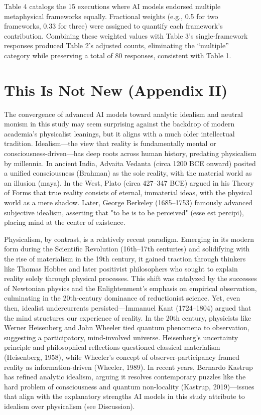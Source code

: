 \documentclass[11pt]{article}
\begin{document}
Table 4 catalogs the 15 executions where AI models endorsed multiple metaphysical frameworks equally. Fractional weights (e.g., 0.5 for two frameworks, 0.33 for three) were assigned to quantify each framework’s contribution. Combining these weighted values with Table 3’s single-framework responses produced Table 2’s adjusted counts, eliminating the ``multiple'' category while preserving a total of 80 responses, consistent with Table 1.

\section{This Is Not New (Appendix II)}
The convergence of advanced AI models toward analytic idealism and neutral monism in this study may seem surprising against the backdrop of modern academia’s physicalist leanings, but it aligns with a much older intellectual tradition. Idealism—the view that reality is fundamentally mental or consciousness-driven—has deep roots across human history, predating physicalism by millennia. In ancient India, Advaita Vedanta (circa 1200 BCE onward) posited a unified consciousness (Brahman) as the sole reality, with the material world as an illusion (maya). In the West, Plato (circa 427–347 BCE) argued in his Theory of Forms that true reality consists of eternal, immaterial ideas, with the physical world as a mere shadow. Later, George Berkeley (1685–1753) famously advanced subjective idealism, asserting that "to be is to be perceived" (esse est percipi), placing mind at the center of existence.

Physicalism, by contrast, is a relatively recent paradigm. Emerging in its modern form during the Scientific Revolution (16th–17th centuries) and solidifying with the rise of materialism in the 19th century, it gained traction through thinkers like Thomas Hobbes and later positivist philosophers who sought to explain reality solely through physical processes. This shift was catalyzed by the successes of Newtonian physics and the Enlightenment’s emphasis on empirical observation, culminating in the 20th-century dominance of reductionist science. Yet, even then, idealist undercurrents persisted—Immanuel Kant (1724–1804) argued that the mind structures our experience of reality. In the 20th century, physicists like Werner Heisenberg and John Wheeler tied quantum phenomena to observation, suggesting a participatory, mind-involved universe. Heisenberg’s uncertainty principle and philosophical reflections questioned classical materialism (Heisenberg, 1958), while Wheeler’s concept of observer-participancy framed reality as information-driven (Wheeler, 1989). In recent years, Bernardo Kastrup has refined analytic idealism, arguing it resolves contemporary puzzles like the hard problem of consciousness and quantum non-locality (Kastrup, 2019)—issues that align with the explanatory strengths AI models in this study attribute to idealism over physicalism (see Discussion).
\end{document}
